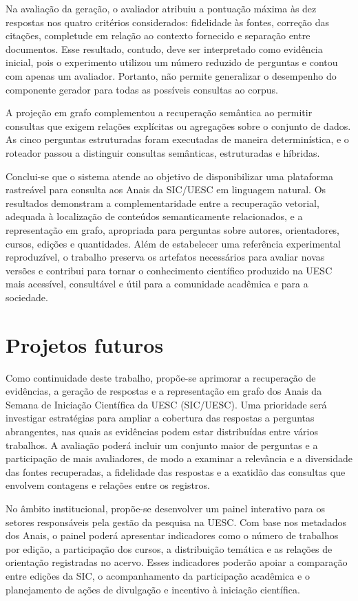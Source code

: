 Na avaliação da geração, o avaliador atribuiu a pontuação máxima às dez respostas nos quatro critérios considerados: fidelidade às fontes, correção das citações, completude em relação ao contexto fornecido e separação entre documentos. Esse resultado, contudo, deve ser interpretado como evidência inicial, pois o experimento utilizou um número reduzido de perguntas e contou com apenas um avaliador. Portanto, não permite generalizar o desempenho do componente gerador para todas as possíveis consultas ao corpus.

A projeção em grafo complementou a recuperação semântica ao permitir consultas que exigem relações explícitas ou agregações sobre o conjunto de dados. As cinco perguntas estruturadas foram executadas de maneira determinística, e o roteador passou a distinguir consultas semânticas, estruturadas e híbridas.

Conclui-se que o sistema atende ao objetivo de disponibilizar uma plataforma rastreável para consulta aos Anais da SIC/UESC em linguagem natural. Os resultados demonstram a complementaridade entre a recuperação vetorial, adequada à localização de conteúdos semanticamente relacionados, e a representação em grafo, apropriada para perguntas sobre autores, orientadores, cursos, edições e quantidades. Além de estabelecer uma referência experimental reproduzível, o trabalho preserva os artefatos necessários para avaliar novas versões e contribui para tornar o conhecimento científico produzido na UESC mais acessível, consultável e útil para a comunidade acadêmica e para a sociedade.

\section{Projetos futuros}

Como continuidade deste trabalho, propõe-se aprimorar a recuperação de evidências, a geração de respostas e a representação em grafo dos Anais da Semana de Iniciação Científica da UESC (SIC/UESC). Uma prioridade será investigar estratégias para ampliar a cobertura das respostas a perguntas abrangentes, nas quais as evidências podem estar distribuídas entre vários trabalhos. A avaliação poderá incluir um conjunto maior de perguntas e a participação de mais avaliadores, de modo a examinar a relevância e a diversidade das fontes recuperadas, a fidelidade das respostas e a exatidão das consultas que envolvem contagens e relações entre os registros.

No âmbito institucional, propõe-se desenvolver um painel interativo para os setores responsáveis pela gestão da pesquisa na UESC. Com base nos metadados dos Anais, o painel poderá apresentar indicadores como o número de trabalhos por edição, a participação dos cursos, a distribuição temática e as relações de orientação registradas no acervo. Esses indicadores poderão apoiar a comparação entre edições da SIC, o acompanhamento da participação acadêmica e o planejamento de ações de divulgação e incentivo à iniciação científica.

